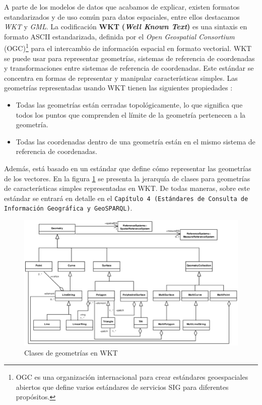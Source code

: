 
A parte de los modelos de datos que acabamos de explicar, existen formatos estandarizados y de uso común para datos espaciales, entre ellos destacamos \textit{WKT} y \textit{GML}. La codificación \textbf{WKT} \textbf{(\textit{Well Known Text})} es una sintaxis en formato ASCII estandarizada, definida por el \textit{Open Geospatial Consortium} (OGC)\footnote{OGC es una organización internacional para crear estándares geoespaciales abiertos que define varios estándares de servicios SIG para diferentes propósitos.} para el intercambio de información espacial en formato vectorial. WKT se puede usar para representar geometrías, sistemas de referencia de coordenadas y transformaciones entre sistemas de referencia de coordenadas. Este estándar se concentra en formas de representar y manipular características simples. Las geometrías representadas usando WKT tienen las siguientes propiedades \cite{wkt-database}:

\begin{itemize}
	\item Todas las geometrías están cerradas topológicamente, lo que significa que todos los puntos que comprenden el límite de la geometría pertenecen a la geometría.
	
	\item Todas las coordenadas dentro de una geometría están en el mismo sistema de referencia de coordenadas.
\end{itemize} 

Además, está basado en un estándar que define cómo representar las geometrías de los vectores. En la figura \ref{fig:the-classes-of-geometries-in-wkt-figure-from-4} se presenta la jerarquía de clases para geometrías de características simples representadas en WKT.  De todas maneras, sobre este estándar se entrará en detalle en el \texttt{Capítulo 4 }\texttt{(Estándares de Consulta de Información Geográfica y GeoSPARQL)}.

\begin{figure}[H]
	\centering
	\includegraphics[width=0.9\linewidth]{imagenes/capitulo2/The-classes-of-geometries-in-WKT-figure-from-4}
	\caption{Clases de geometrías en WKT \cite{wkt-database}}
	\label{fig:the-classes-of-geometries-in-wkt-figure-from-4}
\end{figure}

